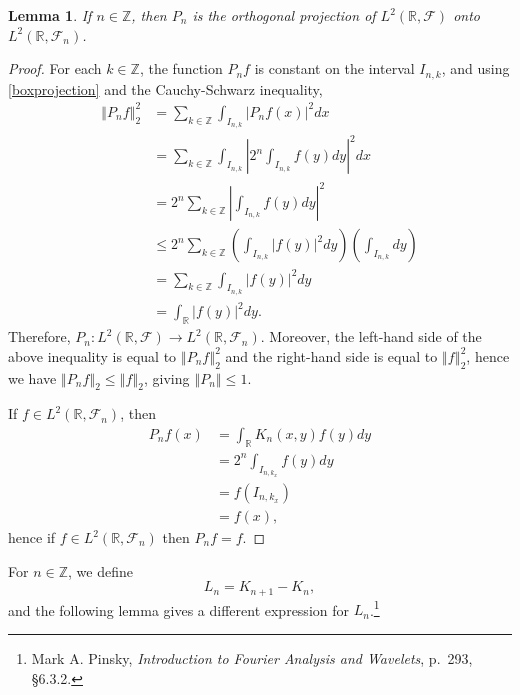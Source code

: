 \documentclass{article}
\newcommand{\norm}[1]{\left\Vert #1 \right\Vert}
\newtheorem{lemma}[theorem]{Lemma}
\theoremstyle{definition}
\begin{document}
\begin{lemma}
If $n \in \mathbb{Z}$, then $P_n$ is the orthogonal projection of $L^2(\mathbb{R},\mathscr{F})$ onto $L^2(\mathbb{R},\mathscr{F}_n)$.
\end{lemma}
\begin{proof}
For each $k \in \mathbb{Z}$, the function
$P_n f$ is constant on the interval $I_{n,k}$, and using \eqref{boxprojection} and the Cauchy-Schwarz inequality,
\begin{align*}
\norm{P_nf}_2^2&=\sum_{k \in \mathbb{Z}} \int_{I_{n,k}} |P_nf(x)|^2 dx\\
&=\sum_{k \in \mathbb{Z}} \int_{I_{n,k}} \left| 2^n \int_{I_{n,k}} f(y) dy \right|^2 dx\\
&= 2^n \sum_{k \in \mathbb{Z}} \left| \int_{I_{n,k}} f(y) dy \right|^2\\
&\leq 2^n \sum_{k \in \mathbb{Z}} \left( \int_{I_{n,k}} |f(y)|^2 dy \right) \left( \int_{I_{n,k}} dy\right)\\
&=\sum_{k \in \mathbb{Z}} \int_{I_{n,k}} |f(y)|^2 dy\\
&=\int_{\mathbb{R}} |f(y)|^2 dy.
\end{align*}
Therefore, $P_n:L^2(\mathbb{R},\mathscr{F}) \to L^2(\mathbb{R},\mathscr{F}_n)$. 
Moreover, the left-hand side of the above inequality is equal to $\norm{P_n f}_2^2$ and the right-hand side is
equal to $\norm{f}_2^2$, hence we have
$\norm{P_n f}_2 \leq \norm{f}_2$, giving $\norm{P_n} \leq 1$.


If $f \in L^2(\mathbb{R},\mathscr{F}_n)$, then
\begin{align*}
P_n f(x)&= \int_{\mathbb{R}} K_n(x,y) f(y) dy\\
&=2^n \int_{I_{n,k_x}} f(y) dy\\
&=f(I_{n,k_x})\\
&=f(x),
\end{align*}
hence if $f \in L^2(\mathbb{R},\mathscr{F}_n)$ then $P_n f=f$.
\end{proof}

For $n \in \mathbb{Z}$, we define
\[
L_n = K_{n+1}-K_n,
\]
and the following lemma gives a different expression for $L_n$.\footnote{Mark A. Pinsky, {\em Introduction to
Fourier Analysis and Wavelets}, p.~293, \S 6.3.2.}
\end{document}
